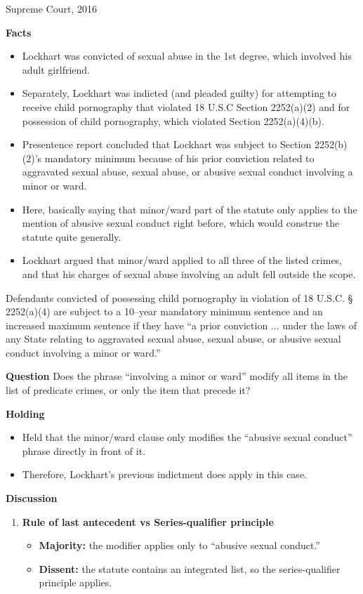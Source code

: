 \documentclass[11pt]{tex/lawoutline}
\begin{document}
{Supreme Court, 2016}
{
\textbf{Facts}
\begin{itemize}
    \item Lockhart was convicted of sexual abuse in the 1st degree, which involved his adult girlfriend. 
    \item Separately, Lockhart was indicted (and pleaded guilty) for attempting to receive child pornography that violated 18 U.S.C Section 2252(a)(2) and for possession of child pornography, which violated Section 2252(a)(4)(b). 
    \item Presentence report concluded that Lockhart was subject to Section 2252(b)(2)'s mandatory minimum because of his prior conviction related to aggravated sexual abuse, sexual abuse, or abusive sexual conduct involving a minor or ward. 
    \item Here, basically saying that minor/ward part of the statute only applies to the mention of abusive sexual conduct right before, which would construe the statute quite generally.
    \item Lockhart argued that minor/ward applied to all three of the listed crimes, and that his charges of sexual abuse involving an adult fell outside the scope. 
\end{itemize}

{Defendants convicted of possessing child pornography in violation of 18 U.S.C. § 2252(a)(4) are subject to a 10–year mandatory minimum sentence and an increased maximum sentence if they have ``a prior conviction ... under the laws of any State relating to aggravated sexual abuse, sexual abuse, or abusive sexual conduct involving a minor or ward.''} 

\textbf{Question} Does the phrase ``involving a minor or ward'' modify all items in the list of predicate crimes, or only the item that precede it?

\textbf{Holding}
\begin{itemize}
    \item Held that the minor/ward clause only modifies the ``abusive sexual conduct'' phrase directly in front of it. 
    \item Therefore, Lockhart's previous indictment does apply in this case. 
\end{itemize}

\textbf{Discussion}

\begin{enumerate}
    \item \textbf{Rule of last antecedent vs Series-qualifier principle}
    \begin{itemize}
        \item \textbf{Majority:} the modifier applies only to ``abusive sexual conduct.''
        \item \textbf{Dissent:} the statute contains an integrated list, so the series-qualifier principle applies.
    \end{itemize}


\end{enumerate}}
\end{document}
